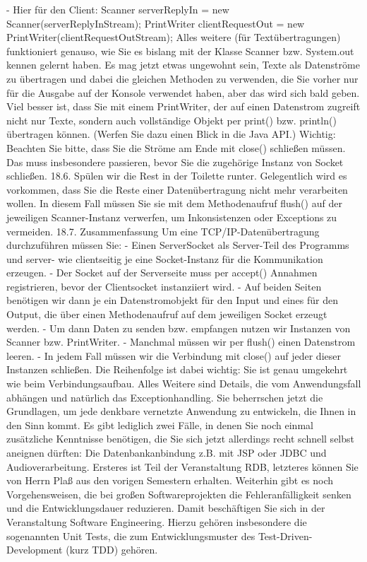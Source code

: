 -	Hier für den Client:
Scanner serverReplyIn = new Scanner(serverReplyInStream);
PrintWriter clientRequestOut = new PrintWriter(clientRequestOutStream);
Alles weitere (für Textübertragungen) funktioniert genauso, wie Sie es bislang mit der Klasse Scanner bzw. System.out kennen gelernt haben. Es mag jetzt etwas ungewohnt sein, Texte als Datenströme zu übertragen und dabei die gleichen Methoden zu verwenden, die Sie vorher nur für die Ausgabe auf der Konsole verwendet haben, aber das wird sich bald geben.
Viel besser ist, dass Sie mit einem PrintWriter, der auf einen Datenstrom zugreift nicht nur Texte, sondern auch vollständige Objekt per print() bzw. println() übertragen können. (Werfen Sie dazu einen Blick in die Java API.)
Wichtig:
Beachten Sie bitte, dass Sie die Ströme am Ende mit close() schließen müssen. Das muss insbesondere passieren, bevor Sie die zugehörige Instanz von Socket schließen.
18.6.	Spülen wir die Rest in der Toilette runter.
Gelegentlich wird es vorkommen, dass Sie die Reste einer Datenübertragung nicht mehr verarbeiten wollen. In diesem Fall müssen Sie sie mit dem Methodenaufruf flush() auf der jeweiligen Scanner-Instanz verwerfen, um Inkonsistenzen oder Exceptions zu vermeiden.
18.7.	Zusammenfassung
Um eine TCP/IP-Datenübertragung durchzuführen müssen Sie:
-	Einen ServerSocket als Server-Teil des Programms
und server- wie clientseitig je eine Socket-Instanz für die Kommunikation erzeugen.
-	Der Socket auf der Serverseite muss per accept() Annahmen registrieren,
bevor der Clientsocket instanziiert wird.
-	Auf beiden Seiten benötigen wir dann je ein Datenstromobjekt für den Input und eines für den Output, die über einen Methodenaufruf auf dem jeweiligen Socket erzeugt werden.
-	Um dann Daten zu senden bzw. empfangen nutzen wir Instanzen von Scanner bzw. PrintWriter.
-	Manchmal müssen wir per flush() einen Datenstrom leeren.
-	In jedem Fall müssen wir die Verbindung mit close() auf jeder dieser Instanzen schließen. Die Reihenfolge ist dabei wichtig: Sie ist genau umgekehrt wie beim Verbindungsaufbau.
Alles Weitere sind Details, die vom Anwendungsfall abhängen und natürlich das Exceptionhandling.
Sie beherrschen jetzt die Grundlagen, um jede denkbare vernetzte Anwendung zu entwickeln, die Ihnen in den Sinn kommt. Es gibt lediglich zwei Fälle, in denen Sie noch einmal zusätzliche Kenntnisse benötigen, die Sie sich jetzt allerdings recht schnell selbst aneignen dürften: Die Datenbankanbindung z.B. mit JSP oder JDBC und Audioverarbeitung. Ersteres ist Teil der Veranstaltung RDB, letzteres können Sie von Herrn Plaß aus den vorigen Semestern erhalten.
Weiterhin gibt es noch Vorgehensweisen, die bei großen Softwareprojekten die Fehleranfälligkeit senken und die Entwicklungsdauer reduzieren. Damit beschäftigen Sie sich in der Veranstaltung Software Engineering. Hierzu gehören insbesondere die sogenannten Unit Tests, die zum Entwicklungsmuster des Test-Driven-Development (kurz TDD) gehören.
